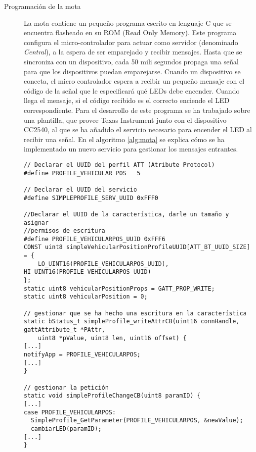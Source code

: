 \begin{description}
	\item[Programación de la mota] La mota contiene un pequeño programa escrito en lenguaje C que se encuentra flasheado en su ROM (Read Only Memory). Este programa configura el micro-controlador para actuar como servidor (denominado \emph{Central}), a la espera de ser emparejado y recibir mensajes. Hasta que se sincroniza con un dispositivo, cada 50 mili segundos propaga una señal para que los dispositivos puedan emparejarse. Cuando un dispositivo se conecta, el micro controlador espera a recibir un pequeño mensaje con el código de la señal que le especificará qué LEDs debe encender. Cuando llega el mensaje, si el código recibido es el correcto enciende el LED correspondiente. Para el desarrollo  de este programa se ha trabajado sobre una plantilla, que provee Texas Instrument junto con el dispositivo CC2540, al que se ha añadido el servicio necesario para encender el LED al recibir una señal. En el algoritmo \ref{alg:mota} se explica cómo se ha implementado un nuevo servicio para gestionar los mensajes entrantes.
	
	\begin{listing}
		\begin{minipage}{.4\textwidth}
			\begin{verbatim}
// Declarar el UUID del perfil ATT (Atribute Protocol)
#define PROFILE_VEHICULAR POS   5

// Declarar el UUID del servicio
#define SIMPLEPROFILE_SERV_UUID 0xFFF0

//Declarar el UUID de la característica, darle un tamaño y asignar 
//permisos de escritura
#define PROFILE_VEHICULARPOS_UUID 0xFFF6
CONST uint8 simpleVehicularPositionProfileUUID[ATT_BT_UUID_SIZE] = {
	LO_UINT16(PROFILE_VEHICULARPOS_UUID), HI_UINT16(PROFILE_VEHICULARPOS_UUID)	
};
static uint8 vehicularPositionProps = GATT_PROP_WRITE;
static uint8 vehicularPosition = 0;

// gestionar que se ha hecho una escritura en la característica
static bStatus_t simpleProfile_writeAttrCB(uint16 connHandle, gattAttribute_t *PAttr,
    uint8 *pValue, uint8 len, uint16 offset) {
[...]    	
notifyApp = PROFILE_VEHICULARPOS;
[...]
}

// gestionar la petición
static void simpleProfileChangeCB(uint8 paramID) {
[...]
case PROFILE_VEHICULARPOS:
  SimpleProfile_GetParameter(PROFILE_VEHICULARPOS, &newValue);
  cambiarLED(paramID);
[...]	
}


\end{verbatim}
\end{minipage}
\end{listing}
\end{description}
